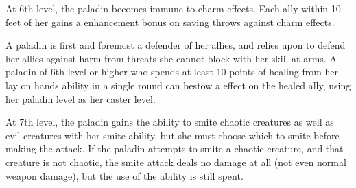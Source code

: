 \begin{comment}
 \cf{Pal}{Special Mount (Sp)}  Upon reaching 5th level, a paladin gains the service of an unusually intelligent, strong, and loyal steed to serve her in her crusade against evil (see below). This mount is usually a heavy warhorse (for a Medium paladin) or a warpony (for a Small paladin).

Once per day, as a full-round action, a paladin may magically call her mount from the celestial realms in which it resides. This ability is the equivalent of a spell of a level equal to one-third the paladin's level. The mount immediately appears adjacent to the paladin and remains for 2 hours per paladin level; it may be dismissed at any time as a swift action. The mount is the same creature each time it is summoned, though the paladin may release a particular mount from service.

Each time the mount is called, it appears in full health, regardless of any damage it may have taken previously. The mount also appears wearing or carrying any gear it had.

\par Should the paladin's mount die, it immediately disappears, leaving behind any equipment it was carrying. The paladin may not summon another mount for thirty days or until she gains a paladin level, whichever comes first, even if the mount is somehow returned from the dead. During this thirty-day period, the paladin  gains a negative level that cannot be removed in any way.
\end{comment}

 At 6th level, the paladin becomes immune to charm effects. Each ally within 10 feet of her gains a  enhancement bonus on saving throws against charm effects.

 A paladin is first and foremost a defender of her allies, and relies upon  to defend her allies against harm from threats she cannot block with her skill at arms. A paladin of 6th level or higher who spends at least 10 points of healing from her lay on hands ability in a single round can bestow a  effect on the healed ally, using her paladin level as her caster level.

 At 7th level, the paladin gains the ability to smite chaotic creatures as well as evil creatures with her smite ability, but she must choose which to smite before making the attack. If the paladin attempts to smite a chaotic creature, and that creature is not chaotic, the smite attack deals no damage at all (not even normal weapon damage), but the use of the ability is still spent.

